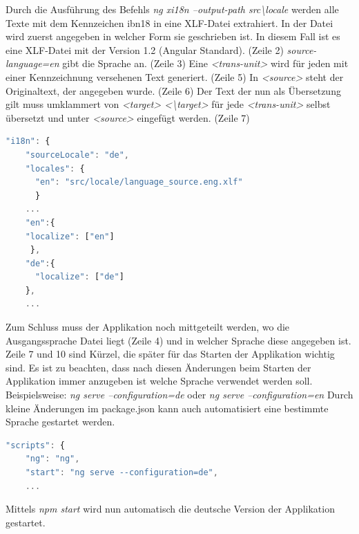 Durch die Ausführung des Befehls \textit{ng xi18n --output-path src\textbackslash locale} werden alle Texte mit dem Kennzeichen ibn18 in eine XLF-Datei
extrahiert. In der Datei wird zuerst angegeben in welcher Form sie geschrieben ist. In diesem Fall ist es eine XLF-Datei mit der Version 1.2 (Angular Standard). (Zeile 2)
\newline
\textit{source-language=\dq en\dq} gibt die Sprache an. (Zeile 3)
\newline
Eine \textit{<trans-unit>} wird für jeden mit einer Kennzeichnung versehenen Text generiert. (Zeile 5)
\newline
In \textit{<source>} steht der Originaltext, der angegeben wurde. (Zeile 6)
\newline
Der Text der nun als Übersetzung gilt muss umklammert von \textit{<target> <\textbackslash target>} für jede \textit{<trans-unit>} selbst übersetzt und unter \textit{<source>} eingefügt werden. (Zeile 7)
\newline
\newline
\begin{lstlisting}[language=TypeScript, caption=Konfigurieren der Sprachen im angular.json, label=lst:Angular.json]
  "i18n": {
    "sourceLocale": "de",
    "locales": {
      "en": "src/locale/language_source.eng.xlf"
      }
    ...
    "en":{
    "localize": ["en"]
     },
    "de":{
      "localize": ["de"]
    },
    ...
\end{lstlisting}
Zum Schluss muss der Applikation noch mittgeteilt werden, wo die Ausgangssprache Datei liegt (Zeile 4) und in welcher Sprache diese angegeben ist. 
Zeile 7 und 10 sind Kürzel, die später für das Starten der Applikation wichtig sind.
\newline
\newline
Es ist zu beachten, dass nach diesen Änderungen beim Starten der Applikation immer anzugeben ist welche Sprache verwendet werden soll.
Beispielsweise: \textit{ng serve --configuration=de} oder \textit{ng serve --configuration=en}
Durch kleine Änderungen im package.json kann auch automatisiert eine bestimmte Sprache gestartet werden.

\begin{lstlisting}[language=TypeScript, caption=automatisches Starten der deutschen Sprache, label=lst:package.json]
  "scripts": {
    "ng": "ng",
    "start": "ng serve --configuration=de",
    ...
\end{lstlisting}
Mittels \textit{npm start} wird nun automatisch die deutsche Version der Applikation gestartet.

